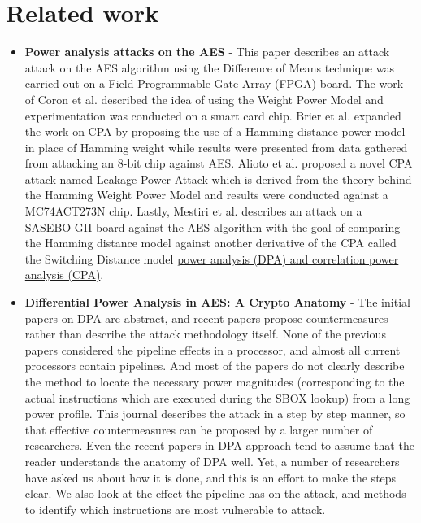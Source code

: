     \section{Related work} \label{sec:LowDataComplexityRelatedWork}
    \begin{itemize}
    \item \textbf{Power analysis attacks on the AES}\cite{lo2017power} -
     This paper describes an attack attack on the AES algorithm using the Difference of Means technique was carried out on a Field-Programmable Gate Array (FPGA) board.
     The work of Coron et al. described the idea of using the Weight Power Model and experimentation was conducted on a smart card chip. Brier et al. expanded the work on CPA by proposing the use of a Hamming distance power model in place of Hamming weight while results were presented from data gathered from attacking an 8-bit chip against AES.
     Alioto et al. proposed a novel CPA attack named Leakage Power Attack which is derived from the theory behind the Hamming Weight Power Model and results were conducted against a MC74ACT273N chip.
     Lastly, Mestiri et al. describes an attack on a SASEBO-GII board against the AES algorithm with the goal of comparing the Hamming distance model against another derivative of the CPA called the Switching Distance model
    \href{https://doi.org/10.1080/23742917.2016.1231523}{power analysis (DPA) and correlation power analysis (CPA)}.

    \item  \textbf{Differential Power Analysis in AES: A Crypto Anatomy}\cite{jude_differential_Power_analysis} -
    The  initial  papers  on  DPA  are  abstract,  and  recent  papers  propose countermeasures  rather  than  describe  the  attack  methodology  itself.
    None  of  the  previous  papers considered the pipeline effects in a processor, and almost all current processors contain pipelines. 
    And most  of  the papers  do  not clearly  describe  the method  to  locate the  necessary power  magnitudes (corresponding to  the actual instructions which  are executed during  the SBOX lookup) from a long power profile.  
    This journal describes the attack in a step by step manner, so that effective countermeasures can be proposed by a larger number of researchers. 
    Even the recent papers in DPA approach tend to assume that the reader understands the anatomy of DPA well.
    Yet, a number of researchers have asked us about how it is done, and this is an effort to  make the steps clear. 
    We also look at the effect the pipeline has on the attack, and methods to identify which instructions are most vulnerable to attack.


\end{itemize}
